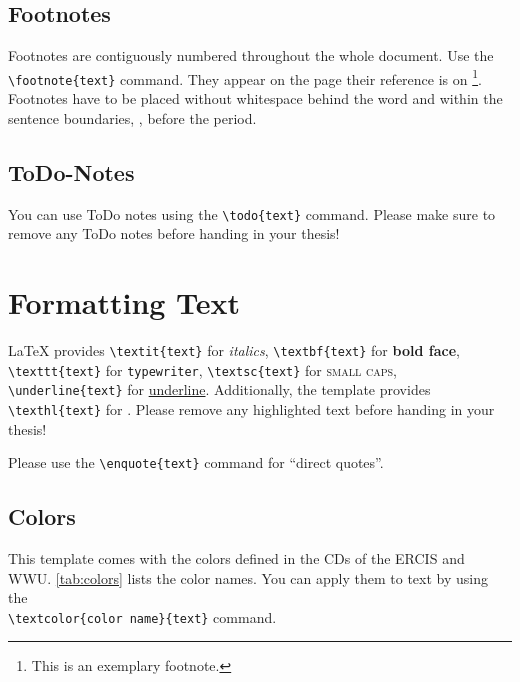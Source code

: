 \subsection{Footnotes}
Footnotes are contiguously numbered throughout the whole document. Use the \texttt{\textbackslash footnote\{text\}} command.  They appear on the page their reference is on \footnote{This is an exemplary footnote.}. Footnotes have to be placed without whitespace behind the word and within the sentence boundaries, \ie, before the period.

\subsection{ToDo-Notes}
You can use ToDo notes using the \texttt{\textbackslash todo\{text\}}  command. Please make sure to remove any ToDo notes before handing in your thesis! 

\section{Formatting Text}
\LaTeX \- provides \texttt{\textbackslash textit\{text\}} for \textit{italics}, \texttt{\textbackslash textbf\{text\}} for \textbf{bold face}, \texttt{\textbackslash texttt\{text\}} for \texttt{typewriter}, \texttt{\textbackslash textsc\{text\}} for \textsc{small caps}, \texttt{\textbackslash underline\{text\}} for \underline{underline}. Additionally, the template provides  \texttt{\textbackslash texthl\{text\}} for . Please remove any highlighted text before handing in your thesis!

Please use the \texttt{\textbackslash enquote\{text\}} command for \enquote{direct quotes}.

\subsection{Colors}
This template comes with the colors defined in the \glspl{CD} of the \acrshort{ERCIS} and \acrshort{WWU}. \Tab \ref{tab:colors} lists the color names. You can apply them to text by using the  \\ \texttt{\textbackslash textcolor\{color name\}\{text\}} command.
	
